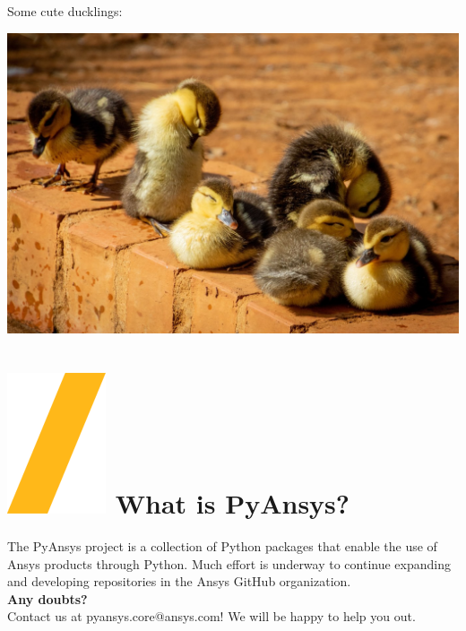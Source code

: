 \documentclass[a0paper,fleqn]{src/betterposter}
\begin{document}
{Some cute ducklings:
\begin{center}
\includegraphics[width=\textwidth]{img/example/ducklings}
\end{center}

\section{\includegraphics[height=\fontcharht\font`\S]{img/general/slash.png} What is PyAnsys?}
The PyAnsys project is a collection of Python packages that enable the use of Ansys products through Python.
Much effort is underway to continue expanding and developing repositories in the Ansys GitHub organization.
\\
\newline
\textbf{Any doubts?} \\Contact us at pyansys.core@ansys.com! We will be happy to help you out.
\\
\newline

}
\end{document}
